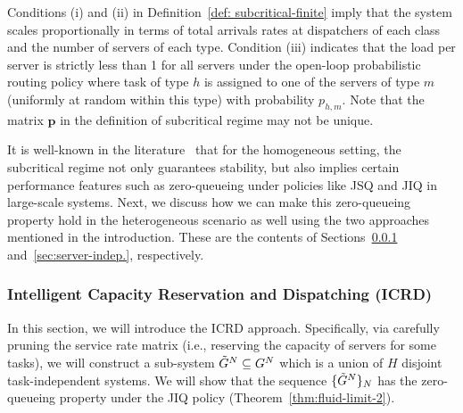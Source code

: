 \documentclass[11pt, reqno]{article}
\numberwithin{equation}{section}
\numberwithin{theorem}{section}
\begin{document}
Conditions (i) and (ii) in Definition~\ref{def: subcritical-finite} imply that the system scales proportionally in terms of total arrivals rates at dispatchers of each class and the number of servers of each type. 
Condition (iii) indicates that the load per server is strictly less than 1 for all servers under the open-loop probabilistic routing policy where task of type $h$ is assigned to one of the servers of type $m$ (uniformly at random within this type) with probability $p_{h,m}$. 
Note that the matrix $\mathbf{p}$ in the definition of subcritical regime may not be unique. 

It is well-known in the literature~\cite{Stolyar15, Stolyar17, MBLW16-3} that for the homogeneous setting, the subcritical regime not only guarantees stability, but also implies certain performance features such as zero-queueing under policies like JSQ and JIQ in large-scale systems. 
Next, we discuss how we can make this zero-queueing property hold in the heterogeneous scenario as well using the two approaches mentioned in the introduction. 
These are the contents of Sections~\ref{sec:dispatcher-independent} and~\ref{sec:server-indep.}, respectively.



\subsubsection{Intelligent Capacity Reservation and Dispatching (ICRD)}\label{sec:dispatcher-independent}
In this section, we will introduce the ICRD approach. 
Specifically, via carefully pruning the service rate matrix (i.e., reserving the capacity of servers for some tasks), we will construct a sub-system $\Tilde{G}^N\subseteq G^N$ which is a union of $H$ disjoint task-independent systems.
We will show that the sequence $\{\Tilde{G}^N\}_{N}$ has the zero-queueing property under the JIQ policy (Theorem~\ref{thm:fluid-limit-2}). 
\end{document}
